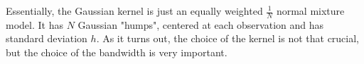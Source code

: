Essentially, the Gaussian kernel is just an equally weighted $\frac{1}{N}$ normal mixture model. It has $N$ Gaussian "humps", centered at each observation and has standard deviation $h$. As it turns out, the choice of the kernel is not that crucial, but the choice of the bandwidth is very important.